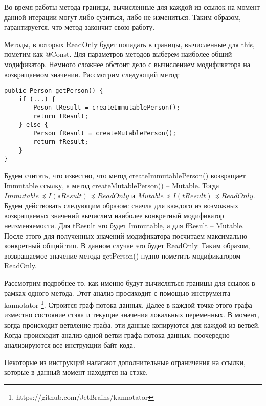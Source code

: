 Во время работы метода границы, вычисленные для каждой из ссылок на момент данной итерации могут либо сузиться, либо не измениться. Таким образом, гарантируется, что метод закончит свою работу.

Методы, в которых ReadOnly будет попадать в границы, вычисленные для this, пометим как @Const. Для параметров методов выберем наиболее общий модификатор. Немного сложнее обстоит дело с вычислением модификатора на возвращаемом значении. Рассмотрим следующий метод:

\begin{lstlisting}[caption=Вывод модификатора неизменяемости для возвращаемого методом значения, label=code:return_value_analyze]
public Person getPerson() {
    if (...) {
        Peson tResult = createImmutablePerson();
        return tResult;
    } else {
        Person fResult = createMutablePerson();
        return fResult;
    } 
} 
\end{lstlisting}

Будем считать, что известно, что метод createImmutablePerson() возвращает Immutable ссылку, а метод createMutablePerson() -- Mutable. Тогда $Immutable \preceq I(аResult) \preceq ReadOnly$ и $Mutable \preceq I(tResult) \preceq ReadOnly$. Будем действовать следующим образом: сначла для каждого из возможных возвращаемых значений вычислим наиболее конкретный модификатор неизменяемости. Для tResult это будет Immutable, а для fResult -- Mutable. После этого для полученных значений модификатора посчитаем максимально конкретный общий тип. В данном случае это будет ReadOnly. Таким образом, возвращаемое значение метода getPerson() нудно пометить модификатором ReadOnly. 

Рассмотрим подробнее то, как именно будут вычисляться границы для ссылок в рамках одного метода. Этот анализ просиходит с помощью инструмента kannotator \footnote{https://github.com/JetBrains/kannotator}. Строится граф потока данных. Далее в каждой точке этого графа изместно состояние стэка и текущие значения локальных переменных. В момент, когда происходит ветвление графа, эти данные копируются для каждой из ветвей. Когда происходит анализ одной ветви графа потока данных, поочередно анализируются все инструкции байт-кода. 

Некоторые из инструкций налагают дополнительные ограничения на ссылки, которые в данный момент находятся на стэке.

